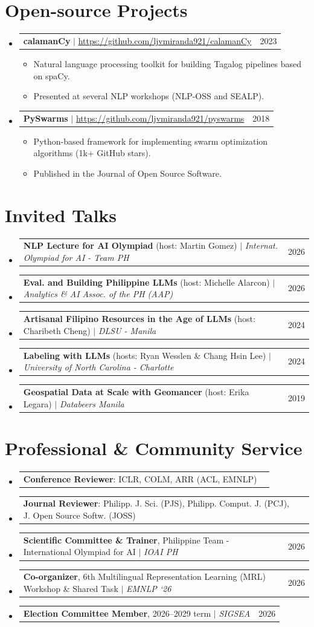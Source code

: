 \documentclass[a4paper,11pt]{article}
\makeatletter
\newcommand{\resumeItem}[1]{
  \item\small{
    {#1 \vspace{-2pt}}
  }
}
\newcommand{\resumeProjectHeading}[2]{
    \item
    \begin{tabular*}{0.97\textwidth}{l@{\extracolsep{\fill}}r}
      \small#1 & #2 \\
    \end{tabular*}\vspace{-7pt}
}
\newcommand{\resumeSubHeadingListStart}{\begin{itemize}[leftmargin=0.15in, label={}]}
\newcommand{\resumeSubHeadingListEnd}{\end{itemize}}
\newcommand{\resumeItemListStart}{\begin{itemize}}
\newcommand{\resumeItemListEnd}{\end{itemize}\vspace{-5pt}}
\makeatother
\begin{document}
\section{Open-source Projects}
\resumeSubHeadingListStart
\resumeProjectHeading
{\textbf{calamanCy} $|$ \url{https://github.com/ljvmiranda921/calamanCy}}{2023}
\resumeItemListStart
\resumeItem{Natural language processing toolkit for building Tagalog pipelines based on spaCy.}
\resumeItem{Presented at several NLP workshops (NLP-OSS and SEALP).}
\resumeItemListEnd
\resumeProjectHeading
{\textbf{PySwarms} $|$ \url{https://github.com/ljvmiranda921/pyswarms}}{2018}
\resumeItemListStart
\resumeItem{Python-based framework for implementing swarm optimization algorithms (1k+ GitHub stars).}
\resumeItem{Published in the Journal of Open Source Software.}
\resumeItemListEnd
\resumeSubHeadingListEnd

\section{Invited Talks}
\resumeSubHeadingListStart
\resumeProjectHeading
{\textbf{NLP Lecture for AI Olympiad} (host: Martin Gomez) $|$ \emph{Internat. Olympiad for AI - Team PH}}{2026}
\resumeProjectHeading
{\textbf{Eval. and Building Philippine LLMs} (host: Michelle Alarcon) $|$ \emph{Analytics \& AI Assoc. of the PH (AAP)}}{2026}
\resumeProjectHeading
{\textbf{Artisanal Filipino Resources in the Age of LLMs} (host: Charibeth Cheng) $|$ \emph{DLSU - Manila}}{2024}
\resumeProjectHeading
{\textbf{Labeling with LLMs} (hosts: Ryan Wesslen \& Chang Hsin Lee) $|$ \emph{University of North Carolina - Charlotte}}{2024}
\resumeProjectHeading
{\textbf{Geospatial Data at Scale with Geomancer} (host: Erika Legara) $|$ \emph{Databeers Manila}}{2019}
\resumeSubHeadingListEnd

\section{Professional \& Community Service}
\resumeSubHeadingListStart
\resumeProjectHeading
{\textbf{Conference Reviewer}: ICLR, COLM, ARR (ACL, EMNLP)}{}
\resumeProjectHeading
{\textbf{Journal Reviewer}: Philipp. J. Sci. (PJS), Philipp. Comput. J. (PCJ), J. Open Source Softw. (JOSS)}{}
\resumeProjectHeading
{\textbf{Scientific Committee \& Trainer}, Philippine Team - International Olympiad for AI $|$ \emph{IOAI PH}}{2026}
\resumeProjectHeading
{\textbf{Co-organizer}, 6th Multilingual Representation Learning (MRL) Workshop \& Shared Task $|$ \emph{EMNLP `26}}{2026}
\resumeProjectHeading
{\textbf{Election Committee Member}, 2026--2029 term $|$ \emph{SIGSEA}}{2026}
\resumeSubHeadingListEnd
\end{document}
